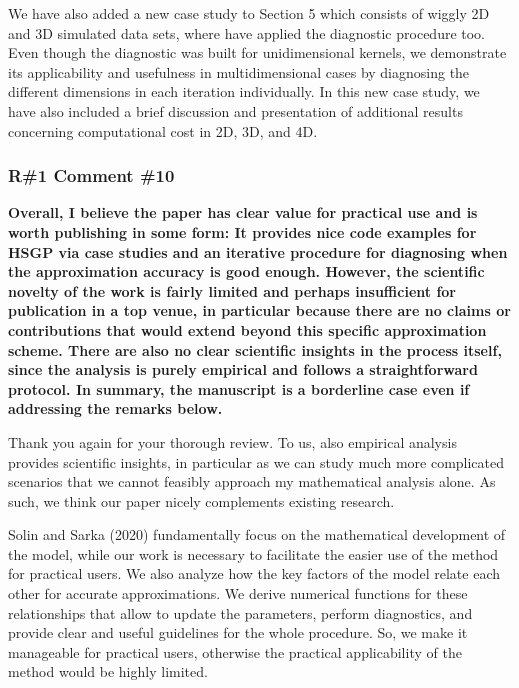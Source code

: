 \documentclass[11pt]{report}
\begin{document}


We have also added a new case study to Section 5 which consists of wiggly 2D and 3D simulated data sets, where have applied the diagnostic procedure too. Even though the diagnostic was built for unidimensional kernels, we demonstrate its applicability and usefulness in multidimensional cases by diagnosing the different dimensions in each iteration individually. 
In this new case study, we have also included a brief discussion and presentation of additional results concerning computational cost in 2D, 3D, and 4D.

\subsubsection*{R\#1 Comment \#10}

\textbf{Overall, I believe the paper has clear value for practical use and is worth publishing in some form: It provides nice code examples for HSGP via case studies and an iterative procedure for diagnosing when the approximation accuracy is good enough. However, the scientific novelty of the work is fairly limited and perhaps insufficient for publication in a top venue, in particular because there are no claims or contributions that would extend beyond this specific approximation scheme. There are also no clear scientific insights in the process itself, since the analysis is purely empirical and follows a straightforward protocol. In summary, the manuscript is a borderline case even if addressing the remarks below.}

Thank you again for your thorough review. To us, also empirical analysis provides scientific insights, in particular as we can study much more complicated scenarios that we cannot feasibly approach my mathematical analysis alone. As such, we think our paper nicely complements existing research.

Solin and Sarka (2020) fundamentally focus on the mathematical development of the model, while our work is necessary to facilitate the easier use of the method for practical users. We also analyze how the key factors of the model relate each other for accurate approximations. We derive numerical functions for these relationships that allow to update the parameters, perform diagnostics, and provide clear and useful guidelines for the whole procedure. So, we make it manageable for practical users, otherwise the practical applicability of the method would be highly limited.
\end{document}
